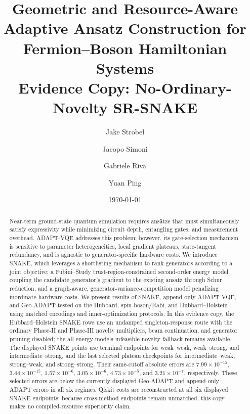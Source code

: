 \documentclass[
  reprint,
  amsmath,
  amssymb,
  aps,
  pra,
  nofootinbib,
  superscriptaddress,
  floatfix
]{revtex4-2}
\begin{document}
\makeatletter
\def\bibsection{\section*{\refname}\@nobreaktrue}
\makeatother

\title{Geometric and Resource-Aware Adaptive Ansatz Construction for Fermion--Boson Hamiltonian Systems\\
\large Evidence Copy: No-Ordinary-Novelty SR-SNAKE}

\author{Jake Strobel}
\author{Jacopo Simoni}
\author{Gabriele Riva}
\author{Yuan Ping}

\date{\today}

\begin{abstract}
Near-term ground-state quantum simulation requires ansätze that must simultaneously satisfy expressivity while minimizing circuit depth, entangling gates, and measurement overhead. ADAPT-VQE addresses this problem; however, its gate-selection mechanism is sensitive to parameter heterogeneities, local gradient plateaus, state-tangent redundancy, and is agnostic to generator-specific hardware costs. We introduce SNAKE, which leverages a shortlisting mechanism to rank generators according to a joint objective: a Fubini--Study trust-region-constrained second-order energy model coupling the candidate generator's gradient to the existing ansatz through Schur reduction, and a graph-aware, generator-variance-competition model penalizing inordinate hardware costs. We present results of SNAKE, append-only ADAPT-VQE, and Geo-ADAPT tested on the Hubbard, spin-boson/Rabi, and Hubbard--Holstein using matched encodings and inner-optimization protocols. In this evidence copy, the Hubbard--Holstein SNAKE rows use an undamped singleton-response route with the ordinary Phase-II and Phase-III novelty multipliers, beam continuation, and generator pruning disabled; the all-energy-models-infeasible novelty fallback remains available. The displayed SNAKE points use terminal endpoints for weak--weak, weak--strong, and intermediate--strong, and the last selected plateau checkpoints for intermediate--weak, strong--weak, and strong--strong. Their same-cutoff absolute errors are \(7.99\times10^{-15}\), \(3.44\times10^{-15}\), \(1.57\times10^{-6}\), \(3.05\times10^{-6}\), \(4.73\times10^{-5}\), and \(3.21\times10^{-7}\), respectively. These selected errors are below the currently displayed Geo-ADAPT and append-only ADAPT errors in all six regimes. Qiskit costs are reconstructed at all six displayed SNAKE endpoints; because cross-method endpoints remain unmatched, this copy makes no compiled-resource superiority claim.


\end{abstract}
\end{document}
